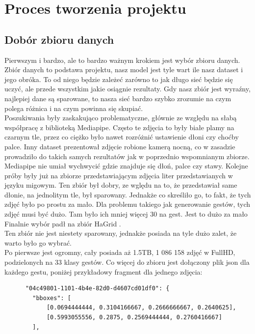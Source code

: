 \documentclass[12pt]{article}
\begin{document}
\begin{sloppypar}
\section{Proces tworzenia projektu}
{
  \subsection{Dobór zbioru danych}
  {
    Pierwszym i bardzo, ale to bardzo ważnym krokiem jest wybór zbioru danych. 
    Zbiór danych to podstawa projektu, nasz model jest tyle wart ile nasz dataset i jego obróka. 
    To od niego będzie zależeć zarówno to jak długo sieć będzie się uczyć, ale przede wszystkim jakie osiągnie rezultaty. 
    Gdy nasz zbiór jest wyraźny, najlepiej dane są sparowane, to nasza sieć bardzo szybko zrozumie na czym polega różnica i na czym powinna się skupiać. \\
    Poszukiwania były zaskakująco problematyczne, głównie ze względu na słabą współpracę z biblioteką Mediapipe. 
    Często te zdjęcia to były białe plamy na czarnym tle, przez co ciężko było nawet rozróżnić ustawienie dłoni czy choćby palce.
    Inny dataset prezentował zdjęcie robione kamerą nocną, co w zasadzie prowadziło do takich samych rezultatów jak w poprzednio wspomnianym zbiorze.
    Mediapipe nie umiał wychwycić gdzie znajduje się dłoń, palce czy stawy. 
    Kolejne próby były już na zbiorze przedstawiającym zdjęcia liter przedstawianych w języku migowym. 
    Ten zbiór był dobry, ze wględu na to, że przedstawiał same dłonie, na jednolitym tle, był sparowany. 
    Jednakże co skreśliło go, to fakt, że tych zdjęć było po prostu za mało. 
    Dla problemu takiego jak generowanie gestów, tych zdjęć musi być dużo. Tam było ich mniej więcej 30 na gest. Jest to dużo za mało \\
    Finalnie wybór padł na zbiór HaGrid \cite{nuzhdin2024hagridv21mimagesstatic}. \\
    Ten zbiór nie jest niestety sparowany, jednakże posiada na tyle dużo zalet, że warto było go wybrać. \\
    Po pierwsze jest ogromny, cały posiada aż 1.5TB, 1 086 158 zdjęć w FullHD, podzielonych na 33 klasy gestów. 
    Co więcej do zbioru jest dołączony plik json dla każdego gestu, poniżej przykładowy fragment dla jednego zdjęcia:
    \begin{lstlisting}
      "04c49801-1101-4b4e-82d0-d4607cd01df0": {
        "bboxes": [
            [0.0694444444, 0.3104166667, 0.2666666667, 0.2640625],
            [0.5993055556, 0.2875, 0.2569444444, 0.2760416667]
        ],

\end{lstlisting}}}
\end{sloppypar}
\end{document}
